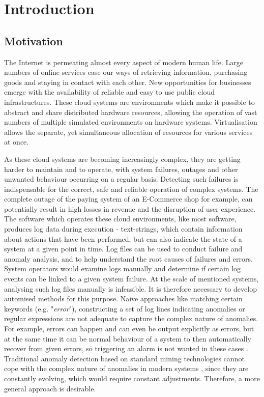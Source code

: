 \chapter{Introduction\label{cha:introduction}}


\section{Motivation\label{sec:motivation}}
The Internet is permeating almost every aspect of modern human life. Large numbers of online services ease our ways of retrieving information, purchasing goods and staying in contact with each other. New opportunities for businesses emerge with the availability of reliable and easy to use public cloud infrastructures. These cloud systems are environments which make it possible to abstract and share distributed hardware resources, allowing the operation of vast numbers of multiple simulated environments on hardware systems. Virtualisation allows the separate, yet simultaneous allocation of resources for various services at once.

As these cloud systems are becoming increasingly complex, they are getting harder to maintain and to operate, with system failures, outages and other unwanted behaviour occurring on a regular basis. Detecting such failures is indispensable for the correct, safe and reliable operation of complex systems. The complete outage of the paying system of an E-Commerce shop for example, can potentially result in high losses in revenue and the disruption of user experience. The software which operates these cloud environments, like most software, produces log data during execution - text-strings, which contain information about actions that have been performed, but can also indicate the state of a system at a given point in time. Log files can be used to conduct failure and anomaly analysis, and to help understand the root causes of failures and errors. System operators would examine logs manually and determine if certain log events can be linked to a given system failure. At the scale of mentioned systems, analysing such log files manually is infeasible. It is therefore necessary to develop automised methods for this purpose. Naive approaches like matching certain keywords (e.g. "\textit{error}"), constructing a set of log lines indicating anomalies or regular expressions are not adequate to capture the complex nature of anomalies. For example, errors can happen and can even be output explicitly as errors, but at the same time it can be normal behaviour of a system to then automatically recover from given errors, so triggering an alarm is not wanted in these cases \cite{meng2019loganomaly}. Traditional anomaly detection based on standard mining technologies cannot cope with the complex nature of anomalies in modern systems \cite{du2017deeplog}, since they are constantly evolving, which would require constant adjustments. Therefore, a more general approach is desirable.





